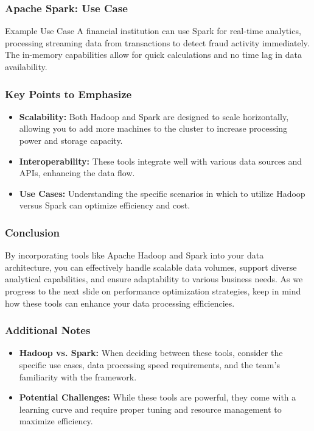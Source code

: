 \documentclass[aspectratio=169]{beamer}
\begin{document}
\begin{frame}[fragile]
    \frametitle{Apache Spark: Use Case}
    \begin{block}{Example Use Case}
        A financial institution can use Spark for real-time analytics, processing streaming data from transactions to detect fraud activity immediately. The in-memory capabilities allow for quick calculations and no time lag in data availability.
    \end{block}
\end{frame}

\begin{frame}[fragile]
    \frametitle{Key Points to Emphasize}
    \begin{itemize}
        \item \textbf{Scalability:} Both Hadoop and Spark are designed to scale horizontally, allowing you to add more machines to the cluster to increase processing power and storage capacity.
        \item \textbf{Interoperability:} These tools integrate well with various data sources and APIs, enhancing the data flow.
        \item \textbf{Use Cases:} Understanding the specific scenarios in which to utilize Hadoop versus Spark can optimize efficiency and cost.
    \end{itemize}
\end{frame}

\begin{frame}[fragile]
    \frametitle{Conclusion}
    By incorporating tools like Apache Hadoop and Spark into your data architecture, you can effectively handle scalable data volumes, support diverse analytical capabilities, and ensure adaptability to various business needs. As we progress to the next slide on performance optimization strategies, keep in mind how these tools can enhance your data processing efficiencies.
\end{frame}

\begin{frame}[fragile]
    \frametitle{Additional Notes}
    \begin{itemize}
        \item \textbf{Hadoop vs. Spark:} When deciding between these tools, consider the specific use cases, data processing speed requirements, and the team's familiarity with the framework.
        \item \textbf{Potential Challenges:} While these tools are powerful, they come with a learning curve and require proper tuning and resource management to maximize efficiency.
    \end{itemize}
\end{frame}
\end{document}
